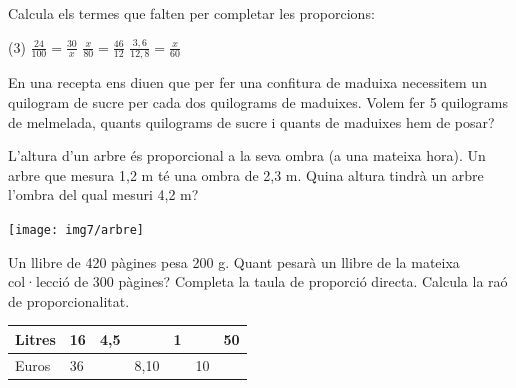 \begin{mylist}
\exer
  Calcula els termes que falten per completar les proporcions:
	\begin{tasks}(3)
		\task $\frac{24}{100}=\frac{30}{x}$
		\task $\frac{x}{80}=\frac{46}{12}$
		\task $\frac{3,6}{12,8}= \frac{x}{60}$	
	\end{tasks}

\answers{[125, $\frac{920}{3}=306.666$, 16.875]}

\exer
  En una recepta ens diuen que per fer una confitura de maduixa
  necessitem un quilogram de sucre per cada dos quilograms de maduixes.
  Volem fer 5 quilograms de melmelada, quants quilograms de sucre i
  quants de maduixes hem de posar?

  
\vspace{-1.25cm}
\exer \begin{minipage}[t]{0.7\textwidth}
	  L'altura d'un arbre és proporcional a la seva ombra (a una mateixa
	hora). Un arbre que mesura 1,2 m té una ombra de 2,3 m. Quina altura
	tindrà un arbre l'ombra del qual mesuri 4,2 m?
\end{minipage}
\begin{minipage}{0.3\textwidth}
	\centering
	\vspace{1.5cm}
	\texttt{[image: img7/arbre]}
\end{minipage}

 

\exer
  Un llibre de 420 pàgines pesa 200 g. Quant pesarà un llibre de la
  mateixa col·lecció de 300 pàgines?
\exer \spen
  Completa la taula de proporció directa.
  Calcula la raó de proporcionalitat.
 
\begin{center}
\begin{tabular}[]{@{}p{1cm}|p{1cm}|p{1cm}|p{1cm}|p{1cm}|p{1cm}|p{1cm}@{}}
\toprule
Litres & 16 & 4,5 & & 1 & & 50\tabularnewline
\midrule
Euros & 36 & & 8,10 & & 10 &\tabularnewline
\bottomrule
\end{tabular}
\end{center}




\end{mylist}
